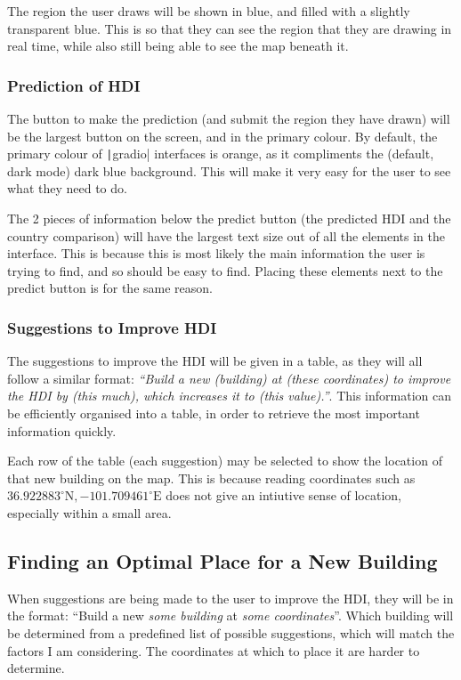 \documentclass[12pt]{report}
\newcommand{\pil}[1]{\protect\texttt|#1|}
\begin{document}
The region the user draws will be shown in blue, and filled with a slightly transparent blue. This is so that they can see the region that they are drawing in real time, while also still being able to see the map beneath it.

\subsubsection{Prediction of HDI}
The button to make the prediction (and submit the region they have drawn) will be the largest button on the screen, and in the primary colour. By default, the primary colour of \pil{gradio} interfaces is orange, as it compliments the (default, dark mode) dark blue background. This will make it very easy for the user to see what they need to do.

The 2 pieces of information below the predict button (the predicted HDI and the country comparison) will have the largest text size out of all the elements in the interface. This is because this is most likely the main information the user is trying to find, and so should be easy to find. Placing these elements next to the predict button is for the same reason.

\subsubsection{Suggestions to Improve HDI}
The suggestions to improve the HDI will be given in a table, as they will all follow a similar format: \textit{``Build a new (building) at (these coordinates) to improve the HDI by (this much), which increases it to (this value).''}. This information can be efficiently organised into a table, in order to retrieve the most important information quickly.

Each row of the table (each suggestion) may be selected to show the location of that new building on the map. This is because reading coordinates such as $36.922883^{\circ}\text{N},-101.709461^{\circ}\text{E}$ does not give an intiutive sense of location, especially within a small area.

\subsection{Finding an Optimal Place for a New Building}\label{sec:optimalPlace}
When suggestions are being made to the user to improve the HDI, they will be in the format: ``Build a new \textit{some building} at \textit{some coordinates}''. Which building will be determined from a predefined list of possible suggestions, which will match the factors I am considering. The coordinates at which to place it are harder to determine.
\end{document}
